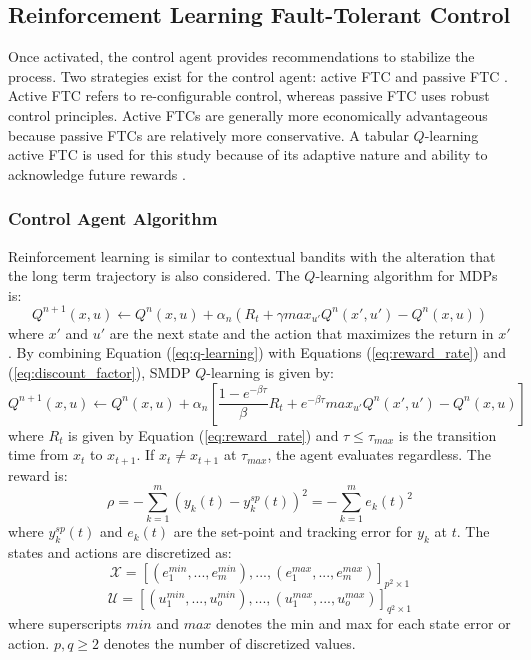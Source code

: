 \subsection{Reinforcement Learning Fault-Tolerant Control}
Once activated, the control agent provides recommendations to stabilize the process.  Two strategies exist for the control agent: active FTC and passive FTC \cite{ftcs_passive_active_ref8}. Active FTC refers to re-configurable control, whereas passive FTC uses robust control principles. Active FTCs are generally more economically advantageous because passive FTCs are relatively more conservative. A tabular $Q$-learning active FTC is used for this study because of its adaptive nature and ability to acknowledge future rewards \cite{rl_control_ref10}. 

\subsubsection{Control Agent Algorithm}
Reinforcement learning is similar to contextual bandits with the alteration that the long term trajectory is also considered. The $Q$-learning algorithm for MDPs is:
\begin{equation}
    Q^{n+1}(x, u) \leftarrow Q^n(x, u) + \alpha_n(R_t + \gamma max_{u'} Q^n(x', u') - Q^n(x, u))
    \label{eq:q-learning}
\end{equation}
where $x'$ and $u'$ are the next state and the action that maximizes the return in $x'$. By combining Equation (\ref{eq:q-learning}) with Equations (\ref{eq:reward_rate}) and (\ref{eq:discount_factor}), SMDP $Q$-learning is given by:
\begin{equation}
    Q^{n+1}(x, u) \leftarrow Q^n(x, u) + \alpha_n \left[\frac{1 - e^{-\beta \tau}}{\beta}R_t + e^{-\beta \tau} max_{u'} Q^n(x', u') - Q^n(x, u) \right]
\label{eq:q-learning-smdp}
\end{equation}
where $R_t$ is given by Equation (\ref{eq:reward_rate}) and $\tau \leq \tau_{max}$ is the transition time from $x_{t}$ to $x_{t+1}$.  If $x_{t} \neq x_{t+1}$ at $\tau_{max}$, the agent evaluates regardless.  The reward is:
\begin{equation}
\rho= - \sum\limits^m_{k=1} (y_{k}(t) - y_{k}^{sp}(t))^2 = - \sum\limits^m_{k=1} e_k(t)^2
\label{eq:mse}
\end{equation}
where $y_{k}^{sp}(t)$ and $e_k(t)$ are the set-point and tracking error for $y_k$ at $t$.  The states and actions are discretized as: 
\begin{equation}
{\mathcal{X}} = [(e_{1}^{min}, ..., e_{m}^{min}), ..., (e_{1}^{max}, ..., e_{m}^{max})]_{p^2 \times 1}
\label{eq:states}
\end{equation}
\begin{equation}
{\mathcal{U}} = [(u_{1}^{min}, ..., u_{o}^{min}), ..., (u_{1}^{max}, ..., u_{o}^{max})]_{q^2 \times 1}
\label{eq:actions}
\end{equation}
where superscripts $min$ and $max$ denotes the min and max for each state error or action. $p, q \geq 2$ denotes the number of discretized values. 

